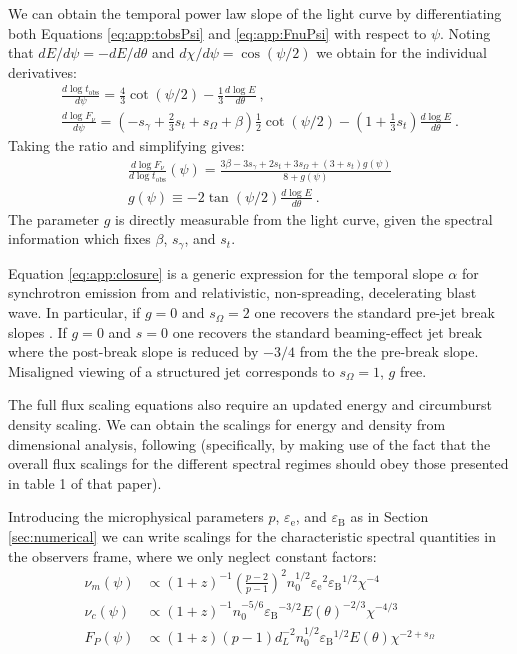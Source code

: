 \documentclass[twocolumn]{aastex62}
\newcommand{\tobs}{\ensuremath{t_{\mathrm{obs}}}}
\newcommand{\epse}{\ensuremath{\varepsilon_{\mathrm{e}}}}
\newcommand{\epsB}{\ensuremath{\varepsilon_{\mathrm{B}}}}
\newcommand{\som}{\ensuremath{s_{\Omega}}}
\begin{document}
	We can obtain the temporal power law slope of the light curve by differentiating both Equations \eqref{eq:app:tobsPsi} and \eqref{eq:app:FnuPsi} with respect to $\psi$.  Noting that $dE/d\psi = -dE/d\theta$ and $d\chi/d\psi = \cos (\psi/2)$ we obtain for the individual derivatives:
\begin{eqnarray}
	\frac{d \log \tobs}{d \psi} = \frac{4}{3} \cot (\psi/2) - \frac{1}{3} \frac{d \log E}{d \theta}\ , \\
	\frac{d \log F_\nu}{d \psi} = \left(-s_\gamma + \frac{2}{3} s_t +\som+\beta\right)\frac{1}{2}\cot(\psi/2) - \left(1+\frac{1}{3}s_t\right) \frac{d \log E}{d \theta}\ .
\end{eqnarray}
Taking the ratio and simplifying gives:
\begin{eqnarray}
	\frac{d \log F_\nu}{d \log \tobs}(\psi) = \frac{3 \beta - 3s_\gamma + 2s_t+3\som + (3+s_t)g(\psi)}{ 8+g(\psi)}  \label{eq:app:closure} \\
	g(\psi) \equiv -2\tan(\psi/2) \frac{d \log E}{d \theta}\ .
\end{eqnarray}
The parameter $g$ is directly measurable from the light curve, given the spectral information which fixes $\beta$, $s_\gamma$, and $s_t$.

Equation \eqref{eq:app:closure} is a generic expression for the temporal slope $\alpha$ for synchrotron emission from and relativistic, non-spreading, decelerating blast wave.  In particular, if $g = 0$ and $\som = 2$ one recovers the standard pre-jet break slopes \citep{Granot:2002aa}.  If $g=0$ and $s=0$ one recovers the standard beaming-effect jet break where the post-break slope is reduced by $-3/4$ from the the pre-break slope.  Misaligned viewing of a structured jet corresponds to $\som = 1$, $g$ free.

The full flux scaling equations also require an updated energy and circumburst density scaling. We can obtain the scalings for energy and density from dimensional analysis, following \citet{van-Eerten:2012ac} (specifically, by making use of the fact that the overall flux scalings for the different spectral regimes should obey those presented in table 1 of that paper).

Introducing the microphysical parameters $p$, $\epse$, and $\epsB$ as in Section \ref{sec:numerical} we can write scalings for the characteristic spectral quantities in the observers frame, where we only neglect constant factors:
\begin{align}
	\nu_m (\psi) &\propto \left(1+z\right)^{-1}\left(\frac{p-2}{p-1}\right)^2 n_0^{1/2} \epse^2 \epsB^{1/2}  \chi^{-4} \label{eq:app:numPsi} \\
	\nu_c (\psi)&\propto  \left(1+z\right)^{-1} n_0^{-5/6} \epsB^{-3/2} E(\theta)^{-2/3} \chi^{-4/3} \label{eq:app:nucPsi} \\
	F_P(\psi)&\propto \left(1+z\right) \left(p-1\right)  d_L^{-2} n_0^{1/2} \epsB^{1/2} E(\theta)  \chi^{-2+\som} \label{eq:app:FPPsi}
\end{align}
\end{document}

